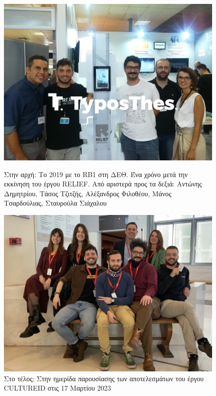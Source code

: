 \begin{figure}[H]\centering
  \includegraphics[scale=0.4]{./figures/parts/appendix/chapters/06/relief_begin.jpg}
  \caption{\small Στην αρχή: Το 2019 με το RB1 στη ΔΕΘ. Ένα χρόνο μετά την
           εκκίνηση του έργου RELIEF. Από αριστερά προς τα δεξιά: Αντώνης
           Δημητρίου, Τάσος Τζιτζής, Αλέξανδρος Φιλοθέου, Μάνος Τσαρδούλιας,
           Σταυρούλα Σιάχαλου}
  \vspace{1cm}
  \includegraphics[scale=0.25]{./figures/parts/appendix/chapters/06/cultureid_end.jpg}
  \caption{\small Στο τέλος: Στην ημερίδα παρουσίασης των αποτελεσμάτων του
           έργου CULTUREID στις 17 Μαρτίου 2023}
\end{figure}


